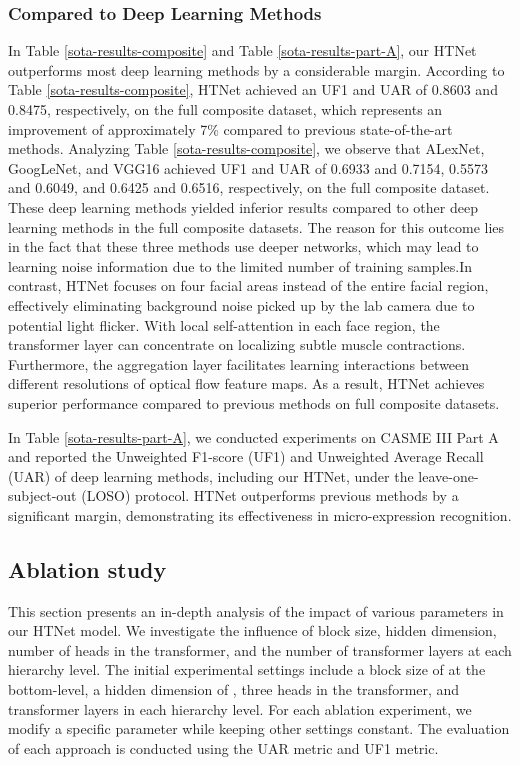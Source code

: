 \documentclass[review,12pt, 3p]{elsarticle}
\begin{document}
\subsubsection{Compared to Deep Learning Methods}
In Table \ref{sota-results-composite} and Table \ref{sota-results-part-A}, our HTNet outperforms most deep learning methods by a considerable margin. According to Table \ref{sota-results-composite}, HTNet achieved an UF1 and UAR of 0.8603 and 0.8475, respectively, on the full composite dataset, which represents an improvement of approximately 7\% compared to previous state-of-the-art methods. Analyzing Table \ref{sota-results-composite}, we observe that ALexNet, GoogLeNet, and VGG16 achieved UF1 and UAR of 0.6933 and 0.7154, 0.5573 and 0.6049, and 0.6425 and 0.6516, respectively, on the full composite dataset. These deep learning methods yielded inferior results compared to other deep learning methods in the full composite datasets. The reason for this outcome lies in the fact that these three methods use deeper networks, which may lead to learning noise information due to the limited number of training samples.In contrast, HTNet focuses on four facial areas instead of the entire facial region, effectively eliminating background noise picked up by the lab camera due to potential light flicker. With local self-attention in each face region, the transformer layer can concentrate on localizing subtle muscle contractions. Furthermore, the aggregation layer facilitates learning interactions between different resolutions of optical flow feature maps. As a result, HTNet achieves superior performance compared to previous methods on full composite datasets.

In Table \ref{sota-results-part-A}, we conducted experiments on CASME III Part A and reported the Unweighted F1-score (UF1) and Unweighted Average Recall (UAR) of deep learning methods, including our HTNet, under the leave-one-subject-out (LOSO) protocol. HTNet outperforms previous methods by a significant margin, demonstrating its effectiveness in micro-expression recognition.

\subsection {Ablation study}
This section presents an in-depth analysis of the impact of various parameters in our HTNet model. We investigate the influence of block size, hidden dimension, number of heads in the transformer, and the number of transformer layers at each hierarchy level. The initial experimental settings include a block size of  at the bottom-level, a hidden dimension of , three heads in the transformer, and  transformer layers in each hierarchy level. For each ablation experiment, we modify a specific parameter while keeping other settings constant. The evaluation of each approach is conducted using the UAR metric and UF1 metric.
\end{document}
